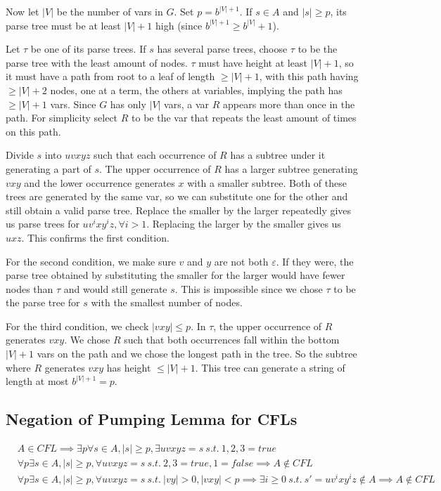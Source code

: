 \documentclass[12 pt]{article}
\begin{document}
Now let $|V|$ be the number of vars in $G$. Set $p = b^{|V| + 1}$. If
$s \in A$ and $|s| \geq p$, its parse tree must be at least $|V| + 1$
high (since $b^{|V| + 1} \geq b^{|V|} + 1$).

Let $\tau$ be one of its parse trees. If $s$ has several parse trees,
choose $\tau$ to be the parse tree with the least amount of
nodes. $\tau$ must have height at least $|V| + 1$, so it must have a
path from root to a leaf of length $\geq |V| + 1$, with this path
having $\geq |V| + 2$ nodes, one at a term, the others at variables,
implying the path has $\geq |V| + 1$ vars. Since $G$ has only $|V|$
vars, a var $R$ appears more than once in the path. For simplicity
select $R$ to be the var that repeats the least amount of times on
this path.

Divide $s$ into $uvxyz$ such that each occurrence of $R$ has a subtree
under it generating a part of $s$. The upper occurrence of $R$ has a
larger subtree generating $vxy$ and the lower occurrence generates $x$
with a smaller subtree. Both of these trees are generated by the same
var, so we can substitute one for the other and still obtain a valid
parse tree. Replace the smaller by the larger repeatedly gives us
parse trees for $uv^ixy^iz, \forall i > 1$. Replacing the larger by
the smaller gives us $uxz$. This confirms the first condition.

For the second condition, we make sure $v$ and $y$ are not both
$\varepsilon$. If they were, the parse tree obtained by substituting
the smaller for the larger would have fewer nodes than $\tau$ and
would still generate $s$. This is impossible since we chose $\tau$ to
be the parse tree for $s$ with the smallest number of nodes.

For the third condition, we check $|vxy| \leq p$. In $\tau$, the upper
occurrence of $R$ generates $vxy$. We chose $R$ such that both
occurrences fall within the bottom $|V| + 1$ vars on the path and we
chose the longest path in the tree. So the subtree where $R$ generates
$vxy$ has height $\leq |V| + 1$. This tree can generate a string of
length at most $b^{|V| + 1} = p$.
\subsection{Negation of Pumping Lemma for CFLs}
\begin{align*}
  & A \in CFL \implies \exists p \forall s \in A, |s| \geq p, \exists uvxyz = s\ s.t.\ 1,2,3=true
  \\ & \forall p \exists s \in A, |s| \geq p, \forall uvxyz=s\ s.t.\ 2,3 = true, 1=false \implies A \notin CFL
  \\ & \forall p \exists s \in A, |s| \geq p, \forall uvxyz = s\ s.t.\ |vy| >0, |vxy|<p \implies \exists i \geq 0\ s.t.\ s'=uv^ixy^iz \notin A \implies A \notin CFL
\end{align*}
\end{document}
